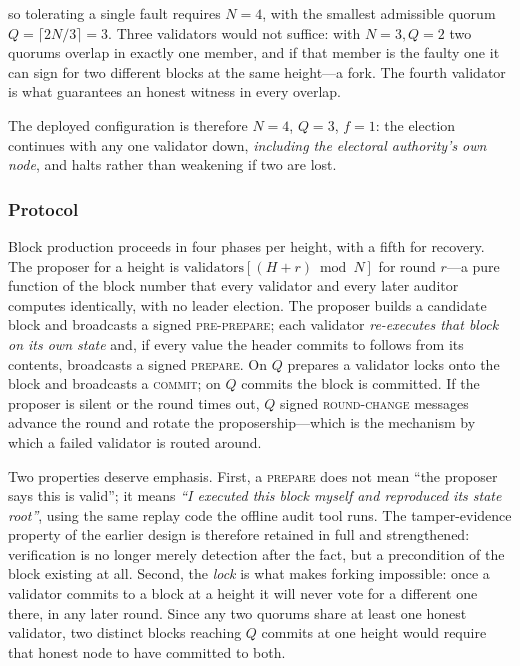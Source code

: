 so tolerating a single fault requires $N = 4$, with the smallest admissible quorum $Q = \lceil 2N/3 \rceil = 3$. Three validators would not suffice: with $N=3, Q=2$ two quorums overlap in exactly one member, and if that member is the faulty one it can sign for two different blocks at the same height---a fork. The fourth validator is what guarantees an honest witness in every overlap.

The deployed configuration is therefore $N=4$, $Q=3$, $f=1$: the election continues with any one validator down, \emph{including the electoral authority's own node}, and halts rather than weakening if two are lost.

\subsubsection{Protocol}

Block production proceeds in four phases per height, with a fifth for recovery. The proposer for a height is $\text{validators}[(H + r) \bmod N]$ for round $r$---a pure function of the block number that every validator and every later auditor computes identically, with no leader election. The proposer builds a candidate block and broadcasts a signed \textsc{pre-prepare}; each validator \emph{re-executes that block on its own state} and, if every value the header commits to follows from its contents, broadcasts a signed \textsc{prepare}. On $Q$ prepares a validator locks onto the block and broadcasts a \textsc{commit}; on $Q$ commits the block is committed. If the proposer is silent or the round times out, $Q$ signed \textsc{round-change} messages advance the round and rotate the proposership---which is the mechanism by which a failed validator is routed around.

Two properties deserve emphasis. First, a \textsc{prepare} does not mean ``the proposer says this is valid''; it means \emph{``I executed this block myself and reproduced its state root''}, using the same replay code the offline audit tool runs. The tamper-evidence property of the earlier design is therefore retained in full and strengthened: verification is no longer merely detection after the fact, but a precondition of the block existing at all. Second, the \emph{lock} is what makes forking impossible: once a validator commits to a block at a height it will never vote for a different one there, in any later round. Since any two quorums share at least one honest validator, two distinct blocks reaching $Q$ commits at one height would require that honest node to have committed to both.

